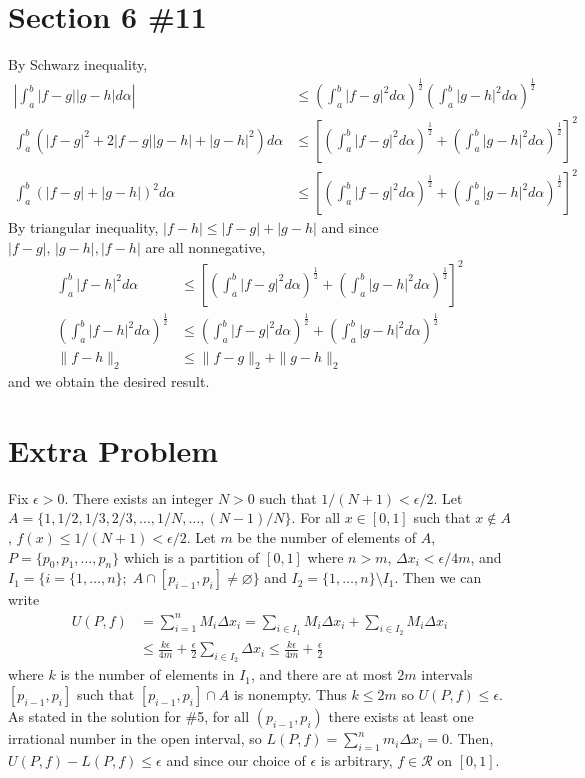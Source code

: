 \documentclass{scrartcl}
\begin{document}
\section{Section 6 \#11}
By Schwarz inequality,
\begin{align*}
  \left| \int^b_a |f - g||g - h| d\alpha \right|
  &\leq \left( \int^b_a |f - g|^2 d\alpha \right)^\frac{1}{2} \left( \int^b_a |g - h|^2 d\alpha \right)^\frac{1}{2} \\
  \int^b_a (|f - g|^2 + 2|f - g||g - h| + |g - h|^2) d\alpha
  &\leq \left[ \left( \int^b_a |f - g|^2 d\alpha \right)^\frac{1}{2} + \left( \int^b_a |g - h|^2 d\alpha \right)^\frac{1}{2} \right]^2 \\
  \int^b_a (|f - g| + |g - h|)^2 d\alpha
  &\leq \left[ \left( \int^b_a |f - g|^2 d\alpha \right)^\frac{1}{2} + \left( \int^b_a |g - h|^2 d\alpha \right)^\frac{1}{2} \right]^2
\end{align*}
By triangular inequality, \(|f - h| \leq |f - g| + |g - h|\) and since \(|f - g|,\, |g - h|, |f - h|\) are all nonnegative,
\begin{align*}
  \int^b_a |f - h|^2 d\alpha
  &\leq \left[ \left( \int^b_a |f - g|^2 d\alpha \right)^\frac{1}{2} + \left( \int^b_a |g - h|^2 d\alpha \right)^\frac{1}{2} \right]^2 \\
  \left( \int^b_a |f - h|^2 d\alpha \right)^\frac{1}{2}
  &\leq \left( \int^b_a |f - g|^2 d\alpha \right)^\frac{1}{2} + \left( \int^b_a |g - h|^2 d\alpha \right)^\frac{1}{2} \\
  \|f - h\|_2 &\leq \|f - g\|_2 + \|g - h\|_2
\end{align*}
and we obtain the desired result.

\section{Extra Problem}
Fix \(\epsilon > 0\).
There exists an integer \(N > 0\) such that \(1 / (N + 1) < \epsilon / 2\).
Let \(A = \{1, 1/2, 1/3, 2/3, \dots, 1/N, \dots, (N - 1) / N\}\).
For all \(x \in [0, 1]\) such that \(x \not \in A\), \(f(x) \leq 1 / (N + 1) < \epsilon / 2\).
Let \(m\) be the number of elements of \(A\), \(P = \{p_0, p_1, \dots, p_n\}\) which is a partition of \([0, 1]\) where \(n > m\), \(\Delta x_i < \epsilon / 4m\), and \(I_1 = \{i = \{1, \dots, n\};\; A \cap [p_{i - 1}, p_i] \not = \varnothing\}\) and \(I_2 = \{1, \dots, n\} \setminus I_1\).
Then we can write
\begin{align*}
  U(P, f)
  &= \sum^n_{i = 1} M_i \Delta x_i
  = \sum_{i \in I_1} M_i \Delta x_i + \sum_{i \in I_2} M_i \Delta x_i \\
  &\leq \frac{k\epsilon}{4m} + \frac{\epsilon}{2} \sum_{i \in I_2} \Delta x_i
  \leq \frac{k\epsilon}{4m} + \frac{\epsilon}{2}
\end{align*}
where \(k\) is the number of elements in \(I_1\), and there are at most \(2m\) intervals \([p_{i - 1}, p_i]\) such that \([p_{i - 1}, p_i] \cap A\) is nonempty.
Thus \(k \leq 2m\) so \(U(P, f) \leq \epsilon\).
As stated in the solution for \#5, for all \((p_{i - 1}, p_i)\) there exists at least one irrational number in the open interval, so \(L(P, f) = \sum^n_{i = 1} m_i \Delta x_i = 0\).
Then, \(U(P, f) - L(P, f) \leq \epsilon\) and since our choice of \(\epsilon\) is arbitrary, \(f \in \mathscr{R}\) on \([0, 1]\).
\end{document}
